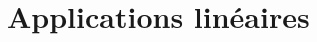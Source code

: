 \documentclass[../main.tex]{subfiles}
\begin{document}
\setcounter{chapter}{20}
\chapter{Applications linéaires}
\tableofcontents
\clearpage
\end{document}

